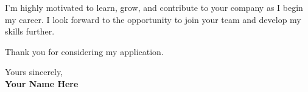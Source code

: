 \documentclass[a4paper,12pt]{article}
\begin{document}
\begin{titlepage}
I’m highly motivated to learn, grow, and contribute to your company as I begin my career. I look forward to the opportunity to join your team and develop my skills further.





\vspace{0.7em}

Thank you for considering my application.

\vspace{0.7em}

\raggedright Yours sincerely,\\
\vspace{0.7em}
\textbf{Your Name Here}

\end{titlepage}
\end{document}
